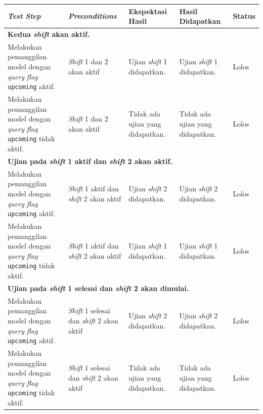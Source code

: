 \begin{enumerate}
        \begin{longtable}{|p{}|p{}|p{}|p{}|p{}|}
            \hline
            \textit{Test Step} & \textit{Preconditions} & Ekspektasi Hasil & Hasil Didapatkan & Status  \\
            \hline
            \endhead
            
            \multicolumn{5}{|p{0.8\textwidth}|}{\textbf{Kedua \textit{shift} akan aktif.}}\\
            \hline
            Melakukan pemanggilan model dengan \textit{query} \textit{flag} \texttt{upcoming} aktif. &
            \textit{Shift} 1 dan 2 akan aktif & Ujian \textit{shift} 1 didapatkan. & Ujian \textit{shift} 1 didapatkan. & Lolos \\
            \hline
            Melakukan pemanggilan model dengan \textit{query} \textit{flag} \texttt{upcoming} tidak aktif. &
            \textit{Shift} 1 dan 2 akan aktif & Tidak ada ujian yang didapatkan. & Tidak ada ujian yang didapatkan. & Lolos \\
            \hline
            
            \multicolumn{5}{|p{0.8\textwidth}|}{\textbf{Ujian pada \textit{shift} 1 aktif dan \textit{shift} 2 akan aktif.}}\\
            \hline
            Melakukan pemanggilan model dengan \textit{query} \textit{flag} \texttt{upcoming} aktif. &
            \textit{Shift} 1 aktif dan \textit{shift} 2 akan aktif & Ujian \textit{shift} 2 didapatkan. & Ujian \textit{shift} 2 didapatkan. & Lolos \\
            \hline
            Melakukan pemanggilan model dengan \textit{query} \textit{flag} \texttt{upcoming} tidak aktif. &
            \textit{Shift} 1 aktif dan \textit{shift} 2 akan aktif & Ujian \textit{shift} 1 didapatkan. & Ujian \textit{shift} 1 didapatkan. & Lolos \\
            \hline
            
            \multicolumn{5}{|p{0.8\textwidth}|}{\textbf{Ujian pada \textit{shift} 1 selesai dan \textit{shift} 2 akan dimulai.}}\\
            \hline
            Melakukan pemanggilan model dengan \textit{query} \textit{flag} \texttt{upcoming} aktif. &
            \textit{Shift} 1 selesai dan \textit{shift} 2 akan aktif & Ujian \textit{shift} 2 didapatkan. & Ujian \textit{shift} 2 didapatkan. & Lolos \\
            \hline
            Melakukan pemanggilan model dengan \textit{query} \textit{flag} \texttt{upcoming} tidak aktif. &
            \textit{Shift} 1 selesai dan \textit{shift} 2 akan aktif & Tidak ada ujian yang didapatkan. & Tidak ada ujian yang didapatkan. & Lolos \\
            \hline
            

\end{longtable}
\end{enumerate}
